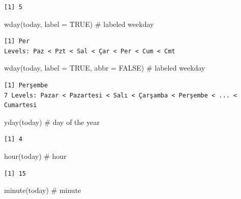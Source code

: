 \documentclass[
  letterpaper,
  DIV=11,
  numbers=noendperiod]{scrreprt}
\newenvironment{Shaded}{\begin{snugshade}}{\end{snugshade}}
\newcommand{\AttributeTok}[1]{\textcolor[rgb]{0.40,0.45,0.13}{#1}}
\newcommand{\CommentTok}[1]{\textcolor[rgb]{0.37,0.37,0.37}{#1}}
\newcommand{\ConstantTok}[1]{\textcolor[rgb]{0.56,0.35,0.01}{#1}}
\newcommand{\FunctionTok}[1]{\textcolor[rgb]{0.28,0.35,0.67}{#1}}
\newcommand{\NormalTok}[1]{\textcolor[rgb]{0.00,0.23,0.31}{#1}}
\begin{document}
\begin{verbatim}
[1] 5
\end{verbatim}

\begin{Shaded}
\begin{Highlighting}[]
\FunctionTok{wday}\NormalTok{(today, }\AttributeTok{label =} \ConstantTok{TRUE}\NormalTok{) }\CommentTok{\# labeled weekday}
\end{Highlighting}
\end{Shaded}

\begin{verbatim}
[1] Per
Levels: Paz < Pzt < Sal < Çar < Per < Cum < Cmt
\end{verbatim}

\begin{Shaded}
\begin{Highlighting}[]
\FunctionTok{wday}\NormalTok{(today, }\AttributeTok{label =} \ConstantTok{TRUE}\NormalTok{, }\AttributeTok{abbr =} \ConstantTok{FALSE}\NormalTok{) }\CommentTok{\# labeled weekday}
\end{Highlighting}
\end{Shaded}

\begin{verbatim}
[1] Perşembe
7 Levels: Pazar < Pazartesi < Salı < Çarşamba < Perşembe < ... < Cumartesi
\end{verbatim}

\begin{Shaded}
\begin{Highlighting}[]
\FunctionTok{yday}\NormalTok{(today) }\CommentTok{\# day of the year}
\end{Highlighting}
\end{Shaded}

\begin{verbatim}
[1] 4
\end{verbatim}

\begin{Shaded}
\begin{Highlighting}[]
\FunctionTok{hour}\NormalTok{(today) }\CommentTok{\# hour}
\end{Highlighting}
\end{Shaded}

\begin{verbatim}
[1] 15
\end{verbatim}

\begin{Shaded}
\begin{Highlighting}[]
\FunctionTok{minute}\NormalTok{(today) }\CommentTok{\# minute}
\end{Highlighting}
\end{Shaded}
\end{document}
